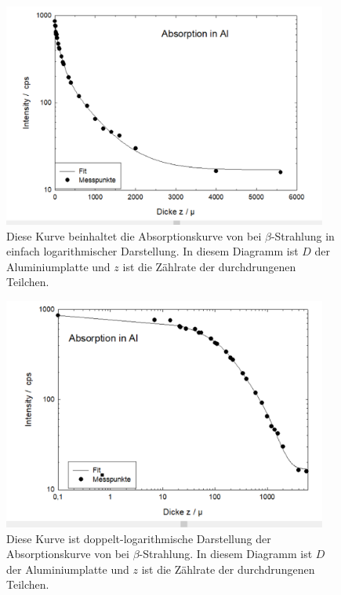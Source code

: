 \documentclass[12pt,english,ngerman]{scrartcl}
\begin{document}
\begin{figure}[H]
	\begin{center}
		\includegraphics[width = 0.95\textwidth]{figures/aluminiumabsorbtion.png}
	\end{center}
	\caption[Absorptionskurve von  bei $\beta$-Strahlung]{
		Diese Kurve beinhaltet die Absorptionskurve von  bei
		$\beta$-Strahlung in einfach logarithmischer Darstellung.
		In diesem Diagramm ist $D$ der Aluminiumplatte und
		$z$ ist die Zählrate der durchdrungenen Teilchen.
	}\label{fig:alu_absorption}
\end{figure}


\begin{figure}[H]
	\begin{center}
		\includegraphics[width = 0.95\textwidth]{figures/aluminiumdoppellog.png}
	\end{center}
	\caption[Doppelt-logarithmsche Darstellung der Absorptionskurve von 
		bei $beta$-Strahlung]{
		Diese Kurve ist doppelt-logarithmische Darstellung der Absorptionskurve von
		 bei $\beta$-Strahlung. In diesem Diagramm ist $D$ der
		Aluminiumplatte und $z$ ist die Zählrate der durchdrungenen Teilchen.
	}\label{fig:alu_doppellog}
\end{figure}
\end{document}

